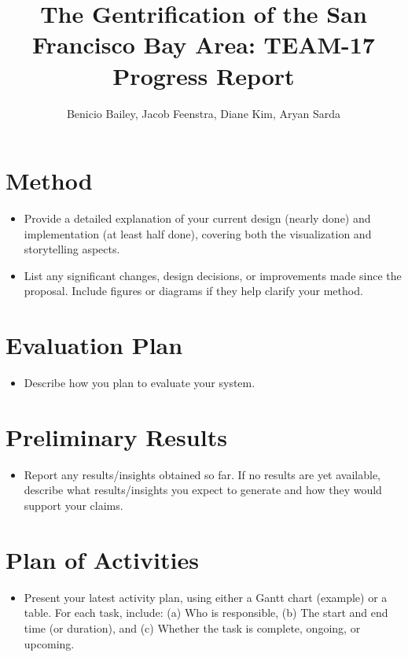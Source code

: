 \documentclass{article}
\title{The Gentrification of the San Francisco Bay Area: TEAM-17 Progress Report}
\author{Benicio Bailey, Jacob Feenstra, Diane Kim, Aryan Sarda}
\begin{document}
\maketitle

\section{Method}

\begin{itemize}
\item  Provide a detailed explanation of your current design (nearly done) and implementation (at least half done), covering both the visualization and storytelling aspects.
\item  List any significant changes, design decisions, or improvements made since the proposal. Include figures or diagrams if they help clarify your method.
\end{itemize}

\section{Evaluation Plan}

\begin{itemize}
\item  Describe how you plan to evaluate your system. 
\end{itemize}


\section{Preliminary Results}

\begin{itemize}
\item  Report any results/insights obtained so far. If no results are yet available, describe what results/insights you expect to generate and how they would support your claims.
\end{itemize}

\section{Plan of Activities}

\begin{itemize}
\item  Present your latest activity plan, using either a Gantt chart (example) or a table. For each task, include: (a) Who is responsible, (b) The start and end time (or duration), and (c) Whether the task is complete, ongoing, or upcoming. 
\end{itemize}
\end{document}
